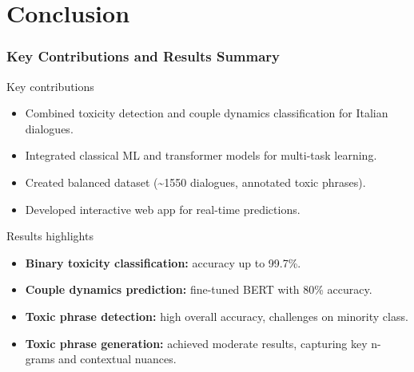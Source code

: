 \documentclass[aspectratio=169,xcolor=dvipsnames]{beamer}
\begin{document}
\section{Conclusion}

\begin{frame}
\frametitle{Key Contributions and Results Summary}

\begin{block}{Key contributions}
\begin{itemize}
\item Combined toxicity detection and couple dynamics classification for Italian dialogues.
\item Integrated classical ML and transformer models for multi-task learning.
\item Created balanced dataset (\textasciitilde 1550 dialogues, annotated toxic phrases).
\item Developed interactive web app for real-time predictions.
\end{itemize}
\end{block}

\begin{block}{Results highlights}
\begin{itemize}
\item \textbf{Binary toxicity classification:} accuracy up to 99.7\%.
\item \textbf{Couple dynamics prediction:} fine-tuned BERT with 80\% accuracy.
\item \textbf{Toxic phrase detection:} high overall accuracy, challenges on minority class.
\item \textbf{Toxic phrase generation:} achieved moderate results, capturing key n-grams and contextual nuances.
\end{itemize}
\end{block}

\end{frame}
\end{document}
